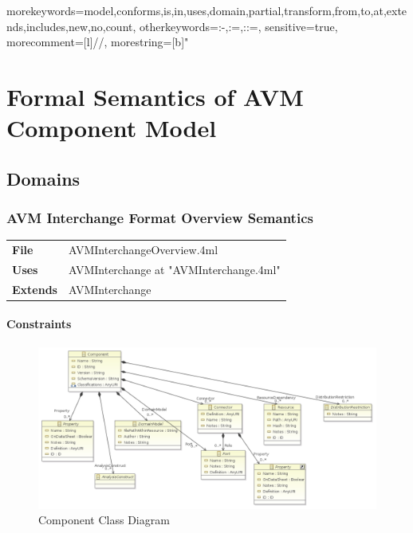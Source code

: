 
   {morekeywords={model,conforms,is,in,uses,domain,partial,transform,from,to,at,extends,includes,new,no,count},
    otherkeywords={:-,:=,::=},
    sensitive=true,
    morecomment=[l]{//},
    morestring=[b]"
   }
\chapter{Formal Semantics of AVM Component Model}
\section{Domains}

\subsection{AVM Interchange Format Overview Semantics}
\begin{tabular}{ l l }
\textbf{File} & AVMInterchangeOverview.4ml \\
\textbf{Uses} & AVMInterchange at "AVMInterchange.4ml" \\
\textbf{Extends} &  AVMInterchange \\
\end{tabular}


\subsubsection{Constraints}



\begin{figure}[H]
\centering
\includegraphics[width=\textwidth]{./AVM_Formal_Semantics/0}
\caption{Component Class Diagram}
\end{figure}

